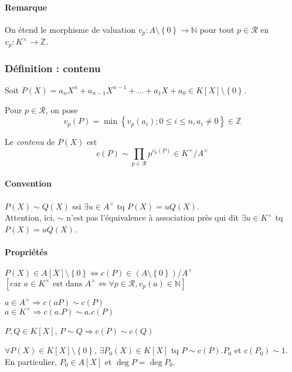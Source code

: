 \documentclass[reqno,a4paper,10pt]{report}
\makeatletter
\newcommand{\set}[1]{\left\lbrace #1 \right\rbrace} %
\newcommand{\IZ}{\ensuremath{\mathbb{Z}}\xspace} %
\newcommand{\IN}{\ensuremath{\mathbb{N}}\xspace} %
\newcommand{\so}{\Rightarrow}
\let\oldenumerate=\enumerate%
\renewenvironment{enumerate}{%
    \oldenumerate%
  }{%
    \@noparlisttrue%
    \endlist%
  }%
\makeatother
\begin{document}

\paragraph{Remarque}
On étend le morphisme de valuation $v_p : A\setminus\set{0} \to \IN$ pour tout
$p\in \mathcal R$ en $v_p:K^\times \to \IZ$.

\subsubsection{Définition : contenu}
Soit $P(X)=a_n X^n +a_{n-1} X^{n-1} + \dots + a_1 X + a_0 \in
K[X]\setminus\set{0}$.

Pour $p\in \mathcal R$, on pose
\[v_p(P)=\min \set{v_p(a_i); 0 \leq i \leq n, a_i \neq 0} \in \IZ\]

Le \emph{contenu} de $P(X)$ est
\[c(P) \sim \prod_{p\in \mathcal R} p^{v_p(P)} \in K^\times/A^\times\]

\paragraph{Convention} $P(X) \sim Q(X)$ ssi $\exists u \in A^\times$ tq
$P(X)=uQ(X)$.\\
Attention, ici, $\sim$ n'est pas l'équivalence à association près qui dit
$\exists u \in K^\times$ tq $P(X)=uQ(X)$.

\paragraph{Propriétés}
\begin{enumerate}
  \item $P(X) \in A[X]\setminus\set{0} \iff c(P)\in \left(
    A\setminus\set{0} \right)/A^\times$\\
    $\left[ \text{car } a\in K^\times \text{ est dans } A^\times \iff \forall p
    \in \mathcal R, v_p(a) \in \IN\right]$
  \item $a\in A^\times \so c(aP) \sim c(P)$\\
    $a\in K^\times \so c(a.P) \sim a.c(P)$
  \item $P,Q \in K[X]$, $P\sim Q \so c(P)\sim c(Q)$
  \item $\forall P(X) \in K[X]\setminus\set{0}$, $\exists P_0(X) \in K[X]$ tq
    $P \sim c(P).P_0$ et $c(P_0) \sim 1$.\\
    En particulier, $P_0 \in A[X]$ et $\deg P=\deg P_0$.
\end{enumerate}
\end{document}
